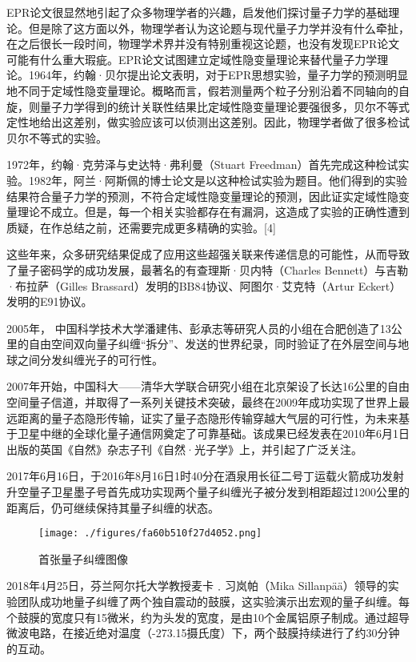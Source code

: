        EPR论文很显然地引起了众多物理学者的兴趣，启发他们探讨量子力学的基础理论。但是除了这方面以外，物理学者认为这论题与现代量子力学并没有什么牵扯，在之后很长一段时间，物理学术界并没有特别重视这论题，也没有发现EPR论文可能有什么重大瑕疵。EPR论文试图建立定域性隐变量理论来替代量子力学理论。1964年，约翰·贝尔提出论文表明，对于EPR思想实验，量子力学的预测明显地不同于定域性隐变量理论。概略而言，假若测量两个粒子分别沿着不同轴向的自旋，则量子力学得到的统计关联性结果比定域性隐变量理论要强很多，贝尔不等式定性地给出这差别，做实验应该可以侦测出这差别。因此，物理学者做了很多检试贝尔不等式的实验。

       1972年，约翰·克劳泽与史达特·弗利曼（Stuart Freedman）首先完成这种检试实验。1982年，阿兰·阿斯佩的博士论文是以这种检试实验为题目。他们得到的实验结果符合量子力学的预测，不符合定域性隐变量理论的预测，因此证实定域性隐变量理论不成立。但是，每一个相关实验都存在有漏洞，这造成了实验的正确性遭到质疑，在作总结之前，还需要完成更多精确的实验。[4] 

       这些年来，众多研究结果促成了应用这些超强关联来传递信息的可能性，从而导致了量子密码学的成功发展，最著名的有查理斯·贝内特（Charles Bennett）与吉勒·布拉萨（Gilles Brassard）发明的BB84协议、阿图尔·艾克特（Artur Eckert）发明的E91协议。

       2005年， 中国科学技术大学潘建伟、彭承志等研究人员的小组在合肥创造了13公里的自由空间双向量子纠缠“拆分”、发送的世界纪录，同时验证了在外层空间与地球之间分发纠缠光子的可行性。

       2007年开始，中国科大——清华大学联合研究小组在北京架设了长达16公里的自由空间量子信道，并取得了一系列关键技术突破，最终在2009年成功实现了世界上最远距离的量子态隐形传输，证实了量子态隐形传输穿越大气层的可行性，为未来基于卫星中继的全球化量子通信网奠定了可靠基础。该成果已经发表在2010年6月1日出版的英国《自然》杂志子刊《自然·光子学》上，并引起了广泛关注。

       2017年6月16日，于2016年8月16日1时40分在酒泉用长征二号丁运载火箭成功发射升空量子卫星墨子号首先成功实现两个量子纠缠光子被分发到相距超过1200公里的距离后，仍可继续保持其量子纠缠的状态。
\begin{figure}[ht]
\centering
\texttt{[image: ./figures/fa60b510f27d4052.png]}
\caption{首张量子纠缠图像} \label{fig_LZJC_3}
\end{figure}
       2018年4月25日，芬兰阿尔托大学教授麦卡﹒习岚帕（Mika Sillanpää）领导的实验团队成功地量子纠缠了两个独自震动的鼓膜，这实验演示出宏观的量子纠缠。每个鼓膜的宽度只有15微米，约为头发的宽度，是由10个金属铝原子制成。通过超导微波电路，在接近绝对温度（-273.15摄氏度）下，两个鼓膜持续进行了约30分钟的互动。
       
